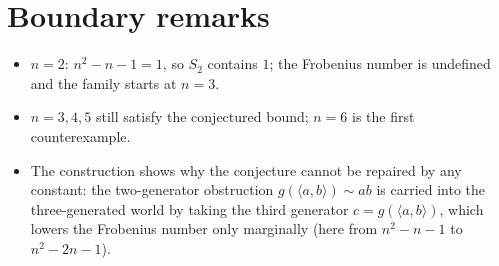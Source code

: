 \documentclass[11pt]{article}
\begin{document}
\section{Boundary remarks}

\begin{itemize}
\item $n=2$: $n^2-n-1=1$, so $S_2$ contains $1$; the Frobenius number is
undefined and the family starts at $n=3$.
\item $n=3,4,5$ still satisfy the conjectured bound; $n=6$ is the first
counterexample.
\item The construction shows why the conjecture cannot be repaired by any
constant: the two-generator obstruction $g(\langle a,b\rangle)\sim ab$ is
carried into the three-generated world by taking the third generator
$c=g(\langle a,b\rangle)$, which lowers the Frobenius number only marginally
(here from $n^2-n-1$ to $n^2-2n-1$).
\end{itemize}
\end{document}
